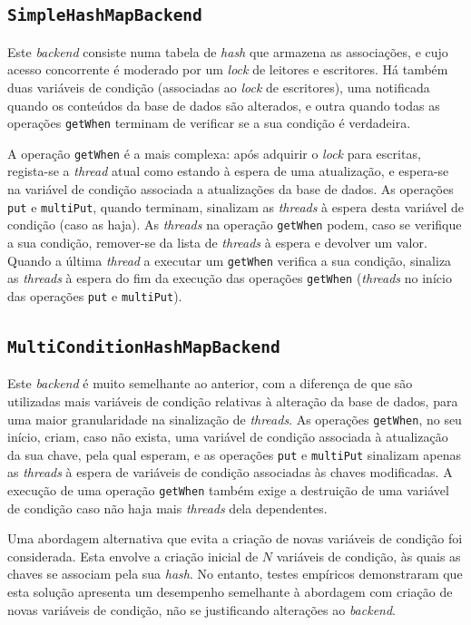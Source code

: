 \documentclass[11pt, a4paper]{article}
\begin{document}
\subsection{\texttt{SimpleHashMapBackend}}

Este \emph{backend} consiste numa tabela de \emph{hash} que armazena as associações, e cujo acesso
concorrente é moderado por um \emph{lock} de leitores e escritores. Há também duas variáveis de
condição (associadas ao \emph{lock} de escritores), uma notificada quando os conteúdos da base de
dados são alterados, e outra quando todas as operações \texttt{getWhen} terminam de verificar se a
sua condição é verdadeira.

A operação \texttt{getWhen} é a mais complexa: após adquirir o \emph{lock} para escritas, regista-se
a \emph{thread} atual como estando à espera de uma atualização, e espera-se na variável de condição
associada a atualizações da base de dados. As operações \texttt{put} e \texttt{multiPut}, quando
terminam, sinalizam as \emph{threads} à espera desta variável de condição (caso as haja). As
\emph{threads} na operação \texttt{getWhen} podem, caso se verifique a sua condição, remover-se da
lista de \emph{threads} à espera e devolver um valor. Quando a última \emph{thread} a executar um
\texttt{getWhen} verifica a sua condição, sinaliza as \emph{threads} à espera do fim da execução das
operações \texttt{getWhen} (\emph{threads} no início das operações \texttt{put} e \texttt{multiPut}).

\subsection{\texttt{MultiConditionHashMapBackend}}

Este \emph{backend} é muito semelhante ao anterior, com a diferença de que são utilizadas mais
variáveis de condição relativas à alteração da base de dados, para uma maior granularidade na
sinalização de \emph{threads}. As operações \texttt{getWhen}, no seu início, criam, caso não exista,
uma variável de condição associada à atualização da sua chave, pela qual esperam, e as operações
\texttt{put} e \texttt{multiPut} sinalizam apenas as \emph{threads} à espera de variáveis de
condição associadas às chaves modificadas. A execução de uma operação \texttt{getWhen} também exige
a destruição de uma variável de condição caso não haja mais \emph{threads} dela dependentes.

Uma abordagem alternativa que evita a criação de novas variáveis de condição foi considerada. Esta
envolve a criação inicial de $N$ variáveis de condição, às quais as chaves se associam pela sua
\emph{hash}. No entanto, testes empíricos demonstraram que esta solução apresenta um desempenho
semelhante à abordagem com criação de novas variáveis de condição, não se justificando alterações ao
\emph{backend}.
\end{document}
